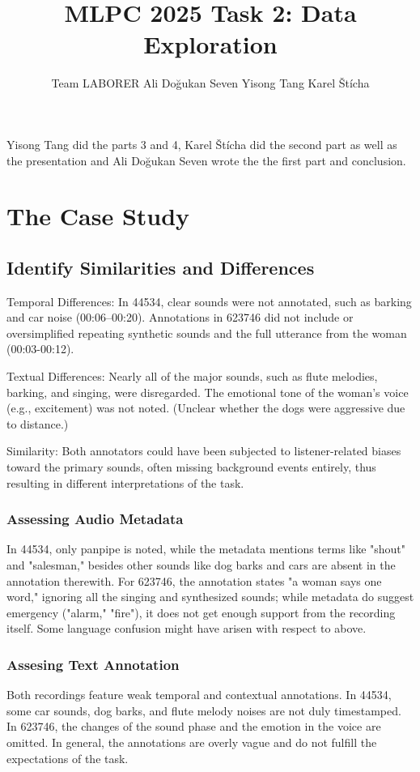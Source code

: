 \documentclass{article}
\title{MLPC 2025 Task 2: Data Exploration}
\author{%
  Team LABORER \AND
  Ali Doğukan Seven
  \And
  Yisong Tang
  \And 
  Karel Štícha
}
\begin{document}
\maketitle


\begin{contributions}
  Yisong Tang did the parts 3 and 4, Karel Štícha did the second part as well as the presentation and Ali Doğukan Seven wrote the the first part and conclusion.
\end{contributions}

\section{The Case Study}
\subsection{Identify Similarities and Differences}

Temporal Differences: In 44534, clear sounds were not annotated, such as barking and car noise (00:06–00:20). Annotations in 623746 did not include or oversimplified repeating synthetic sounds and the full utterance from the woman (00:03-00:12). 

Textual Differences: Nearly all of the major sounds, such as flute melodies, barking, and singing, were disregarded. The emotional tone of the woman's voice (e.g., excitement) was not noted. (Unclear whether the dogs were aggressive due to distance.) 

Similarity: Both annotators could have been subjected to listener-related biases toward the primary sounds, often missing background events entirely, thus resulting in different interpretations of the task.
\subsubsection{Assessing Audio Metadata} In 44534, only panpipe is noted, while the metadata mentions terms like "shout" and "salesman," besides other sounds like dog barks and cars are absent in the annotation therewith. For 623746, the annotation states "a woman says one word," ignoring all the singing and synthesized sounds; while metadata do suggest emergency ("alarm," "fire"), it does not get enough support from the recording itself. Some language confusion might have arisen with respect to above.

\subsubsection{Assesing Text Annotation}
Both recordings feature weak temporal and contextual annotations. In 44534, some car sounds, dog barks, and flute melody noises are not duly timestamped. In 623746, the changes of the sound phase and the emotion in the voice are omitted. In general, the annotations are overly vague and do not fulfill the expectations of the task.
\end{document}

